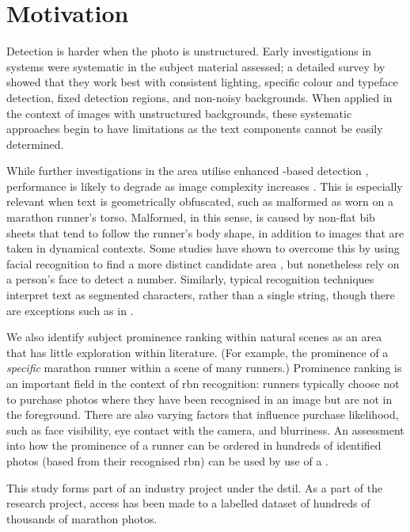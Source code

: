\section{Motivation}
\label{sec:introduction:motivation}

Detection is harder when the photo is unstructured. Early investigations in  systems were systematic in the subject material assessed; a detailed survey by \citet{Anagnostopoulos:2008vu} showed that they work best  with consistent lighting, specific colour and typeface detection, fixed detection regions, and non-noisy backgrounds. When applied in the context of images with unstructured backgrounds, these systematic approaches begin to have limitations as the text components cannot be easily determined.

While further investigations in the area utilise enhanced -based detection \citep{Chen:2011ul,Shivakumara:2011dn,Epshtein:2010tj}, performance is likely to degrade as image complexity increases \citep{Li:2012wd}. This is especially relevant when text is geometrically obfuscated, such as malformed  as worn on a marathon runner's torso. Malformed, in this sense, is caused by non-flat bib sheets that tend to follow the runner's body shape, in addition to images that are taken in dynamical contexts. Some studies have shown to overcome this by using facial recognition to find a more distinct candidate area \citep{Benami:2012jf}, but nonetheless rely on a person's face to detect a number. Similarly, typical recognition techniques interpret text as segmented characters, rather than a single string, though there are exceptions such as in \citet{Zhu:2016ut}.

We also identify subject prominence ranking within natural scenes as an area that has little exploration within literature. (For example, the prominence of a \textit{specific} marathon runner within a scene of many runners.) Prominence ranking is an important field in the context of \gls{rbn} recognition: runners typically choose not to purchase photos where they have been recognised in an image but are not in the foreground. There are also varying factors that influence purchase likelihood, such as face visibility, eye contact with the camera, and blurriness. An assessment into how the prominence of a runner can be ordered in hundreds of identified photos (based from their recognised \gls{rbn}) can be used by use of a .

This study forms part of an industry project under the \gls{dstil}. As a part of the research project, access has been made to a labelled dataset of hundreds of thousands of marathon photos.

